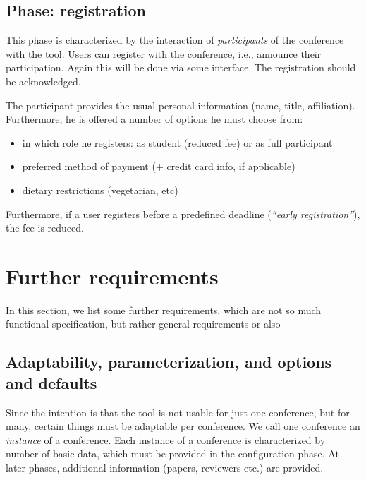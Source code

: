 \subsection{Phase: registration}
\label{sec:registration}

This phase is characterized by the interaction of \emph{participants} of
the conference with the tool. Users can register with the conference, i.e.,
announce their participation. Again this will be done via some interface.
The registration should be acknowledged.  

The participant provides the usual personal information (name, title,
affiliation). Furthermore, he is offered a number of options he must choose
from:
\begin{itemize}
\item in which role he registers: as student (reduced fee) or as full
  participant
\item preferred method of payment (+ credit card info, if applicable)
\item dietary restrictions (vegetarian, etc)
\end{itemize}

Furthermore, if a user registers before a predefined deadline
(\emph{``early registration''}), the fee is reduced.














\section{Further requirements}
\label{sec:further}

In this section, we list some further requirements, which are not so much
functional specification, but rather general requirements or also 


\subsection{Adaptability, parameterization, and options and defaults}
\label{sec:adaptability}%

Since the intention is that the tool is not usable for just one conference,
but for many, certain things must be adaptable per conference. We call one
conference an \emph{instance} of a conference.  Each instance of a
conference is characterized by number of basic data, which must be provided
in the configuration phase. At later phases, additional information
(papers, reviewers etc.) are provided.

